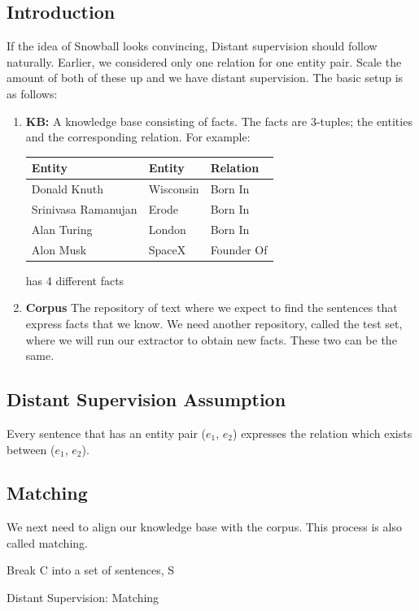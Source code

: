 \documentclass[a4paper,10pt]{article}
\begin{document}
\subsection{Introduction}
If the idea of Snowball looks convincing, Distant supervision should follow naturally.
Earlier, we considered only one relation for one entity pair. Scale the amount of both of these up
and we have distant supervision.
The basic setup is as follows:
\begin{enumerate}[label=(\alph*)]

\item \textbf{ KB:} A knowledge base consisting of facts. The facts are 3-tuples; the entities and the corresponding relation.
For example:
\begin{center}

\begin{tabular}{|l|l|l|}
\hline
Entity & Entity & Relation \\
\hline
Donald Knuth & Wisconsin & Born In\\
Srinivasa Ramanujan & Erode & Born In \\
Alan Turing & London & Born In \\
Alon Musk & SpaceX & Founder Of\\
\hline
\end{tabular}
\end{center}

has 4 different facts

\item \textbf{Corpus}
The repository of text where we expect to find the sentences that express facts that we know.
We need another repository, called the test set, where we will run our extractor to obtain new facts.
These two can be the same.
\end{enumerate}


\subsection{Distant Supervision Assumption}
Every sentence that has an entity pair ($e_1$, $e_2$) expresses the relation which exists between ($e_1$, $e_2$).
\subsection{Matching}
We next need to align our knowledge base with the corpus. This process is also called matching.

\begin{algorithm}[H]
 Break C into a set of sentences, S\;
 \caption{Distant Supervision: Matching}
\end{algorithm}
\end{document}
